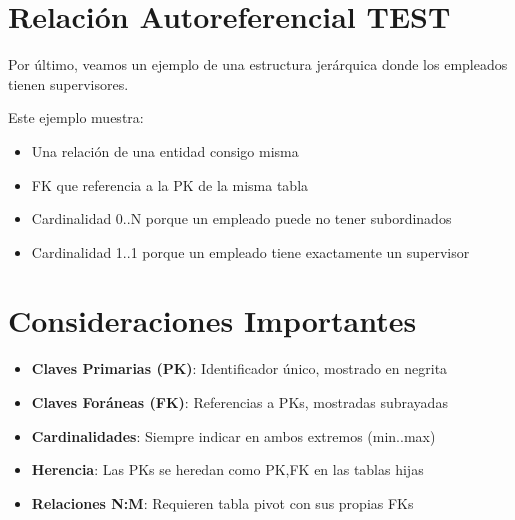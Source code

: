 \documentclass[12pt]{article}
\begin{document}
\section{Relación Autoreferencial TEST}
Por último, veamos un ejemplo de una estructura jerárquica donde los empleados tienen supervisores.

\begin{center}
\end{center}

Este ejemplo muestra:
\begin{itemize}
    \item Una relación de una entidad consigo misma
    \item FK que referencia a la PK de la misma tabla
    \item Cardinalidad 0..N porque un empleado puede no tener subordinados
    \item Cardinalidad 1..1 porque un empleado tiene exactamente un supervisor
\end{itemize}

\section{Consideraciones Importantes}
\begin{itemize}
    \item \textbf{Claves Primarias (PK)}: Identificador único, mostrado en negrita
    \item \textbf{Claves Foráneas (FK)}: Referencias a PKs, mostradas subrayadas
    \item \textbf{Cardinalidades}: Siempre indicar en ambos extremos (min..max)
    \item \textbf{Herencia}: Las PKs se heredan como PK,FK en las tablas hijas
    \item \textbf{Relaciones N:M}: Requieren tabla pivot con sus propias FKs
\end{itemize}
\end{document}

